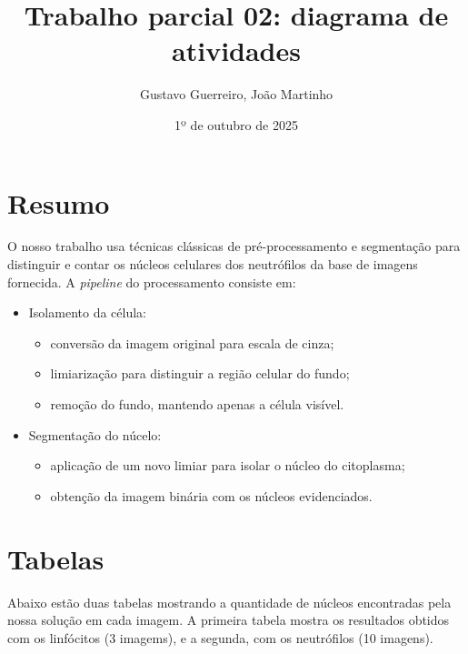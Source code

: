 \documentclass{article}
\title{Trabalho parcial 02: diagrama de atividades}
\author{Gustavo Guerreiro, João Martinho}
\date{1º de outubro de 2025}
\begin{document}
\maketitle

\section{Resumo}

O nosso trabalho usa técnicas clássicas de pré-processamento e segmentação para distinguir e contar os núcleos celulares dos neutrófilos da base de imagens fornecida. A \textit{pipeline} do processamento consiste em:
\begin{itemize}
    \item Isolamento da célula:
    \begin{itemize}
        \item conversão da imagem original para escala de cinza;
        \item limiarização para distinguir a região celular do fundo;
        \item remoção do fundo, mantendo apenas a célula visível.
    \end{itemize}
    \item Segmentação do núcelo:
    \begin{itemize}
        \item aplicação de um novo limiar para isolar o núcleo do citoplasma;
        \item obtenção da imagem binária com os núcleos evidenciados.
    \end{itemize}
\end{itemize}

\section{Tabelas}

Abaixo estão duas tabelas mostrando a quantidade de núcleos encontradas pela nossa solução em cada imagem. A primeira tabela mostra os resultados obtidos com os linfócitos (3 imagems), e a segunda, com os neutrófilos (10 imagens).
\end{document}
